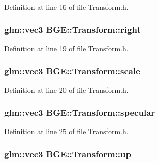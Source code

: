 Definition at line 16 of file Transform.\-h.

\hypertarget{class_b_g_e_1_1_transform_a33fed54241b66010041f63193b920dd0}{
\subsubsection[{right}]{\setlength{\rightskip}{0pt plus 5cm}glm\-::vec3 B\-G\-E\-::\-Transform\-::right}}\label{class_b_g_e_1_1_transform_a33fed54241b66010041f63193b920dd0}


Definition at line 19 of file Transform.\-h.

\hypertarget{class_b_g_e_1_1_transform_ad788c54156f11fcfcd00946b7617a4ae}{
\subsubsection[{scale}]{\setlength{\rightskip}{0pt plus 5cm}glm\-::vec3 B\-G\-E\-::\-Transform\-::scale}}\label{class_b_g_e_1_1_transform_ad788c54156f11fcfcd00946b7617a4ae}


Definition at line 20 of file Transform.\-h.

\hypertarget{class_b_g_e_1_1_transform_a3b4fe0e657be15a4b9a4e768a5bd35d9}{
\subsubsection[{specular}]{\setlength{\rightskip}{0pt plus 5cm}glm\-::vec3 B\-G\-E\-::\-Transform\-::specular}}\label{class_b_g_e_1_1_transform_a3b4fe0e657be15a4b9a4e768a5bd35d9}


Definition at line 25 of file Transform.\-h.

\hypertarget{class_b_g_e_1_1_transform_ad728f83369928a7409b3c889113651b4}{
\subsubsection[{up}]{\setlength{\rightskip}{0pt plus 5cm}glm\-::vec3 B\-G\-E\-::\-Transform\-::up}}\label{class_b_g_e_1_1_transform_ad728f83369928a7409b3c889113651b4}


